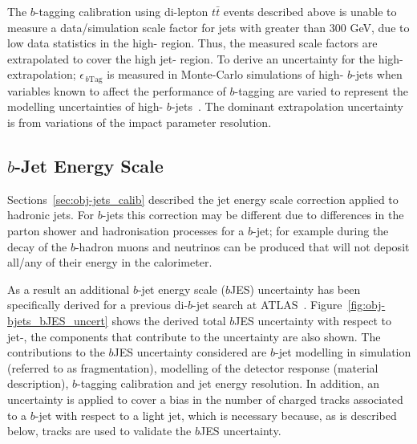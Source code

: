 The $b$-tagging calibration using di-lepton $t\bar{t}$ events described above
is unable to measure a data/simulation scale factor for jets with \pT{} greater than 300 GeV, due to low data statistics in the high-\pT{} region.
Thus, the measured scale factors are extrapolated to cover the high jet-\pT{} region.
To derive an uncertainty for the high-\pT{} extrapolation; $\epsilon_{\,b\text{Tag}}$ is measured in Monte-Carlo simulations of high-\pT{} $b$-jets  
when variables known to affect the performance of $b$-tagging are varied to represent the modelling uncertainties of high-\pT{} $b$-jets~\cite{obj-bjets_calib_highPt}.
The dominant extrapolation uncertainty is from variations of the impact parameter resolution.

\subsection{$b$-Jet Energy Scale}
\label{sec:obj-bjets_bjes}

Sections~\ref{sec:obj-jets_calib} described the
jet energy scale correction applied to hadronic jets.
For $b$-jets this correction may be different due to differences in the parton shower and hadronisation processes for a $b$-jet;
for example during the decay of the $b$-hadron muons and neutrinos can be produced that will not deposit all/any of their energy in the calorimeter.

As a result an additional $b$-jet energy scale ($b$JES) uncertainty has been 
specifically derived for a previous di-$b$-jet search at ATLAS~\cite{dibjet-mori16_paper}.
Figure~\ref{fig:obj-bjets_bJES_uncert} shows the derived total $b$JES uncertainty with respect to jet-\pT{},
the components that contribute to the uncertainty are also shown.
The contributions to the $b$JES uncertainty considered are $b$-jet modelling in simulation (referred to as fragmentation),
modelling of the detector response (material description), $b$-tagging calibration and jet energy resolution.
In addition, an uncertainty is applied to cover a bias in the number of charged tracks associated to a $b$-jet with respect to a light jet,
which is necessary because, as is described below, tracks are used to validate the $b$JES uncertainty.

